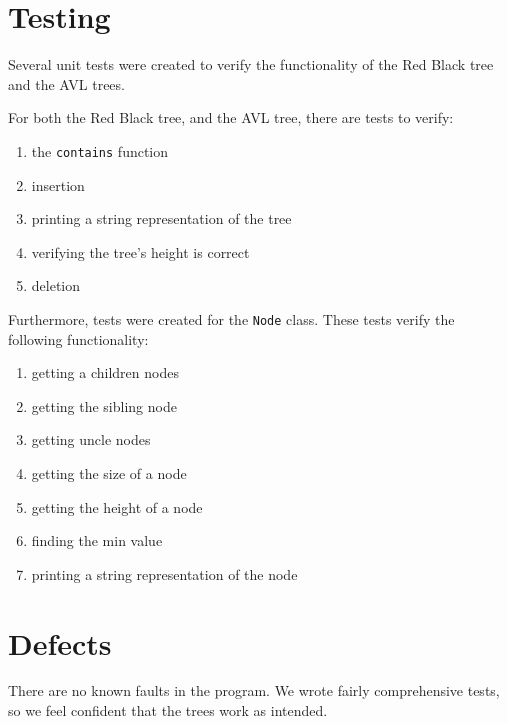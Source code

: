 \documentclass[letterpaper]{article}
\begin{document}
\section{Testing}
Several unit tests were created to verify the functionality of the Red Black
tree and the AVL trees.

For both the Red Black tree, and the AVL tree, there are tests to verify:
\begin{enumerate}
  \item the \texttt{contains} function
  \item insertion
  \item printing a string representation of the tree
  \item verifying the tree's height is correct
  \item deletion
\end{enumerate}

Furthermore, tests were created for the \texttt{Node} class. These tests verify
the following functionality:
\begin{enumerate}
  \item getting a children nodes
  \item getting the sibling node
  \item getting uncle nodes
  \item getting the size of a node
  \item getting the height of a node
  \item finding the min value
  \item printing a string representation of the node
\end{enumerate}

\section{Defects}

There are no known faults in the program.
We wrote fairly comprehensive tests, so we feel confident that the trees work as
intended.
\end{document}
